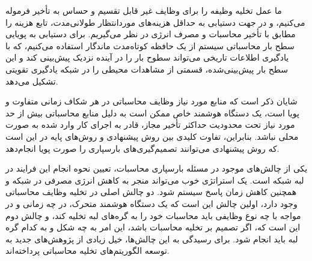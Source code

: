 ما عمل تخلیه وظیفه را برای وظایف غیر قابل تقسیم و حساس به تأخیر فرموله می‌کنیم، و در جهت دستیابی به حداقل هزینه‌های موردانتظار طولانی‌مدت، تابع هزینه را مطابق با تأخیر محاسبات و مصرف انرژی در نظر می‌گیریم. برای دستیابی به پویایی سطح بار محاسباتی سیستم از یک حافظه کوتاه‌مدت ماندگار استفاده می‌کنیم، که با یادگیری اطلاعات تاریخی می‌تواند سطوح بار را در آینده نزدیک پیش‌بینی کند و این سطح بار پیش‌بینی‌شده، قسمتی از مشاهدات محیطی را در شبکه یادگیری تقویتی تشکیل می‌دهد. 

شایان ذکر است که منابع مورد نیاز وظایف محاسباتی در هر شکاف زمانی متفاوت و پویا است، یک دستگاه هوشمند خاص ممکن است به دلیل منابع محاسباتی بیش از حد مورد نیاز تحت محدودیت حداکثر تأخیر مجاز، قادر به اجرای کار وارد شده به صورت محلی نباشد. بنابراین، تفاوت کلیدی بین روش‌ پیشنهادی و روش‌های پایه در این است که روش‌ پیشنهادی می‌توانند تصمیم‌گیری‌های بارسپاری را صورت پویا انجام‌دهد.




















یکی از چالش‌های موجود در مسئله بارسپاری محاسبات، تعیین نحوه انجام این فرایند در لبه شبکه است. یک استراتژی خوب می‌تواند منجر به کاهش انرژی مصرفی در شبکه و همچنین کاهش زمان پاسخ سیستم شود.
 دو چالش اصلی در تخلیه وظایف محاسباتی وجود دارد، اولین چالش این است که یک دستگاه هوشمند متحرک، در چه زمانی و در مواجه با چه نوع وظایفی باید محاسبات خود را به گره‌های لبه تخلیه کند، و چالش دوم این است که، اگر تصمیم بر تخلیه محاسبات باشد، این امر به چه شکل و به کدام گره لبه باید انجام شود. برای رسیدگی به این چالش‌ها، خیل زیادی از پژوهش‌های جدید به توسعه الگوریتم‌های تخلیه محاسباتی پرداخته‌اند.


